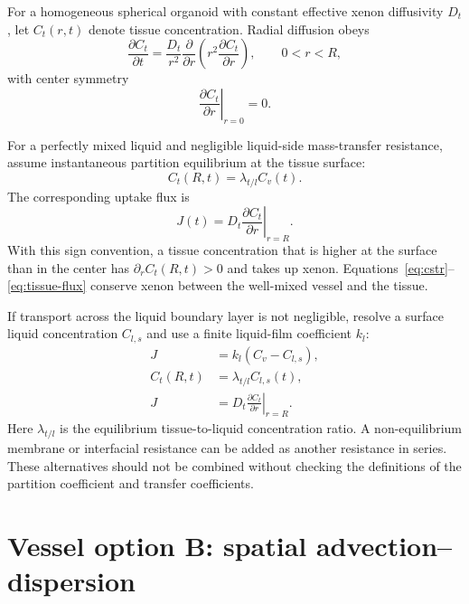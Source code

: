 \documentclass[11pt]{article}
\begin{document}
For a homogeneous spherical organoid with constant effective xenon
diffusivity \(D_t\), let \(C_t(r,t)\) denote tissue concentration. Radial
diffusion obeys
\begin{equation}
  \frac{\partial C_t}{\partial t}
  = \frac{D_t}{r^2}\frac{\partial}{\partial r}
    \left(r^2\frac{\partial C_t}{\partial r}\right),
  \qquad 0<r<R,
  \label{eq:tissue}
\end{equation}
with center symmetry
\begin{equation}
  \left.\frac{\partial C_t}{\partial r}\right|_{r=0}=0.
  \label{eq:center}
\end{equation}

For a perfectly mixed liquid and negligible liquid-side mass-transfer
resistance, assume instantaneous partition equilibrium at the tissue surface:
\begin{equation}
  C_t(R,t)=\lambda_{t/l}C_v(t).
  \label{eq:partition-boundary}
\end{equation}
The corresponding uptake flux is
\begin{equation}
  J(t)=D_t\left.\frac{\partial C_t}{\partial r}\right|_{r=R}.
  \label{eq:tissue-flux}
\end{equation}
With this sign convention, a tissue concentration that is higher at the
surface than in the center has \(\partial_r C_t(R,t)>0\) and takes up xenon.
Equations~\eqref{eq:cstr}--\eqref{eq:tissue-flux} conserve xenon between the
well-mixed vessel and the tissue.

If transport across the liquid boundary layer is not negligible, resolve a
surface liquid concentration \(C_{l,s}\) and use a finite liquid-film
coefficient \(k_l\):
\begin{align}
  J &= k_l\left(C_v-C_{l,s}\right), \label{eq:liquid-film}\\
  C_t(R,t) &= \lambda_{t/l}C_{l,s}(t), \label{eq:finite-partition}\\
  J &= D_t\left.\frac{\partial C_t}{\partial r}\right|_{r=R}.
  \label{eq:finite-flux}
\end{align}
Here \(\lambda_{t/l}\) is the equilibrium tissue-to-liquid concentration
ratio. A non-equilibrium membrane or interfacial resistance can be added as
another resistance in series. These alternatives should not be combined
without checking the definitions of the partition coefficient and transfer
coefficients.

\section{Vessel option B: spatial advection--dispersion}
\end{document}
